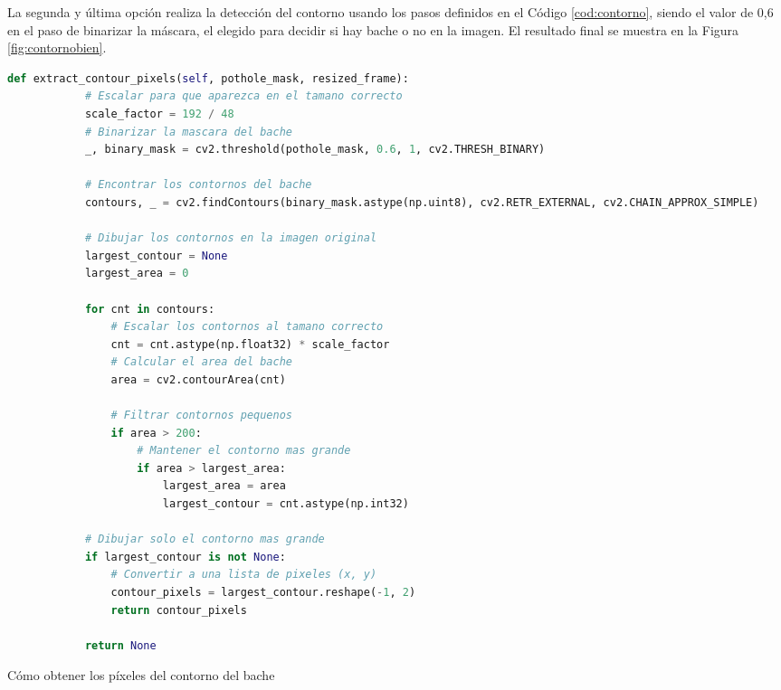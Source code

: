 La segunda y última opción realiza la detección  del contorno usando los pasos definidos en el Código \ref{cod:contorno}, siendo el valor de 0,6 en el paso de binarizar la máscara, el elegido para decidir si hay bache o no en la imagen. El resultado final se muestra en la Figura \ref{fig:contornobien}.

\begin{code}[h]
	\begin{lstlisting}[language=Python]
		def extract_contour_pixels(self, pothole_mask, resized_frame):
			# Escalar para que aparezca en el tamano correcto
			scale_factor = 192 / 48
			# Binarizar la mascara del bache
			_, binary_mask = cv2.threshold(pothole_mask, 0.6, 1, cv2.THRESH_BINARY)
		
			# Encontrar los contornos del bache
			contours, _ = cv2.findContours(binary_mask.astype(np.uint8), cv2.RETR_EXTERNAL, cv2.CHAIN_APPROX_SIMPLE)
		
			# Dibujar los contornos en la imagen original
			largest_contour = None
			largest_area = 0
			
			for cnt in contours:
				# Escalar los contornos al tamano correcto
				cnt = cnt.astype(np.float32) * scale_factor
				# Calcular el area del bache
				area = cv2.contourArea(cnt)
		
				# Filtrar contornos pequenos
				if area > 200:
					# Mantener el contorno mas grande
					if area > largest_area:
						largest_area = area
						largest_contour = cnt.astype(np.int32)
		
			# Dibujar solo el contorno mas grande
			if largest_contour is not None:
				# Convertir a una lista de pixeles (x, y)
				contour_pixels = largest_contour.reshape(-1, 2) 
				return contour_pixels
		
			return None
	\end{lstlisting}
	\caption[Cómo obtener los píxeles del contorno del bache]{Cómo obtener los píxeles del contorno del bache}
	\label{cod:contorno}
\end{code}

